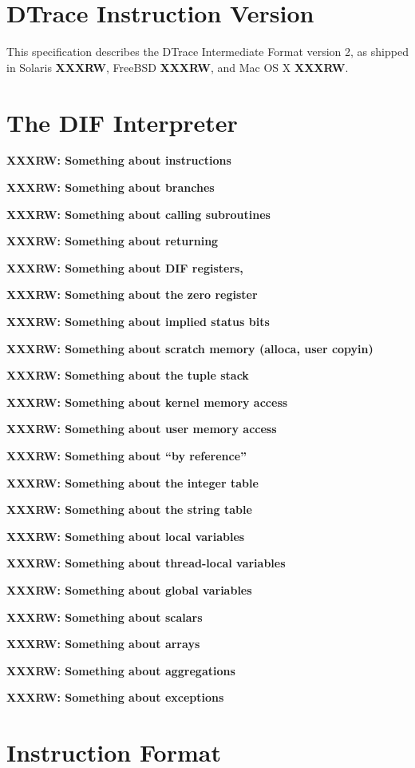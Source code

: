 
\section{DTrace Instruction Version}

This specification describes the DTrace Intermediate Format version 2, as
shipped in Solaris \textbf{XXXRW}, FreeBSD \textbf{XXXRW}, and Mac OS X
\textbf{XXXRW}.

\section{The DIF Interpreter}

\textbf{XXXRW: Something about instructions}

\textbf{XXXRW: Something about branches}

\textbf{XXXRW: Something about calling subroutines}

\textbf{XXXRW: Something about returning}

\textbf{XXXRW: Something about DIF registers, \nregs{}}

\textbf{XXXRW: Something about the zero register}

\textbf{XXXRW: Something about implied status bits}

\textbf{XXXRW: Something about scratch memory (alloca, user copyin)}

\textbf{XXXRW: Something about the tuple stack}

\textbf{XXXRW: Something about kernel memory access}

\textbf{XXXRW: Something about user memory access}

\textbf{XXXRW: Something about ``by reference''}

\textbf{XXXRW: Something about the integer table}

\textbf{XXXRW: Something about the string table}

\textbf{XXXRW: Something about local variables}

\textbf{XXXRW: Something about thread-local variables}

\textbf{XXXRW: Something about global variables}

\textbf{XXXRW: Something about scalars}

\textbf{XXXRW: Something about arrays}

\textbf{XXXRW: Something about aggregations}

\textbf{XXXRW: Something about exceptions}

\section{Instruction Format}

